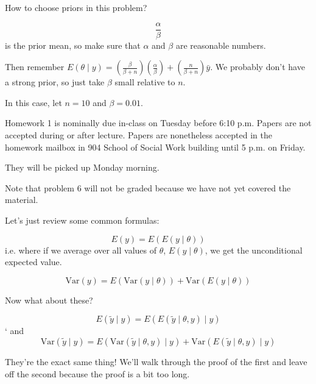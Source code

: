 \documentclass[a4paper]{article}
\begin{document}
How to choose priors in this problem?

\begin{equation}
	\frac{\alpha}{\beta}
\end{equation}
is the prior mean, so make sure that $\alpha$ and $\beta$ are reasonable numbers.

Then remember $E\left( \theta \mid y \right) = \left( \frac{\beta}{\beta + n}
\right)\left( \frac{\alpha}{\beta} \right) + \left( \frac{n}{\beta + n}
\right)\bar{y}$. We probably don't have a strong prior, so just take $\beta$
small relative to $n$.

In this case, let $n = 10$ and $\beta = 0.01$.

Homework 1 is nominally due in-class on Tuesday before 6:10 p.m. Papers are not
accepted during or after lecture. Papers are nonetheless accepted in the
homework mailbox in 904 School of Social Work building until 5 p.m. on Friday.

They will be picked up Monday morning.

Note that problem 6 will not be graded because we have not yet covered the material.

Let's just review some common formulas:

\begin{equation}
	E\left( y \right) = E\left( E\left( y \mid \theta \right) \right)
\end{equation}
i.e. where if we average over all values of $\theta$, $E\left( y \mid \theta
\right)$, we get the unconditional expected value.

\begin{equation}
	\text{Var}\left( y \right) = E\left( \text{Var}\left( y \mid \theta \right) \right) + \text{Var}\left( E\left( y \mid \theta \right) \right)
\end{equation}

Now what about these?

\begin{equation}
	E\left( \tilde{y} \mid y \right) = E\left( E\left( \tilde{y} \mid \theta, y \right) \mid y \right)
\end{equation}`
and
\begin{equation}
	\text{Var}\left( \tilde{y} \mid y \right) = E\left( \text{Var} \left( \tilde{y} \mid \theta, y \right) \mid y \right) + \text{Var}\left( E \left( \tilde{y} \mid \theta, y \right) \mid y \right)
\end{equation}

They're the exact same thing! We'll walk through the proof of the first and
leave off the second because the proof is a bit too long.
\end{document}
